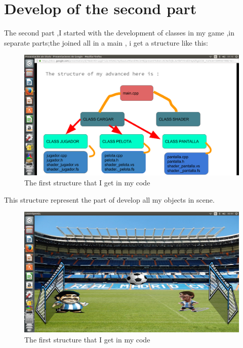 \documentclass[10pt,conference]{IEEEtran}
\begin{document}
\section{Develop of the second part}
    The second part ,I started with the development of classes in my game ,in  separate parts;the joined all in a main , i get a structure like this:
\begin{figure}[h!]
\centering
\includegraphics[scale=0.14]{estrucura.png}
\caption{  The first structure that I get in my code }
\label{fig:Strucutre1}
\end{figure}    
    This structure represent the part of develop all my objects in scene.
\begin{figure}[h!]
\centering
\includegraphics[scale=0.14]{avance.png}
\caption{  The first structure that I get in my code }
\label{fig:Struutre scene }
\end{figure}     
    
\end{document}

